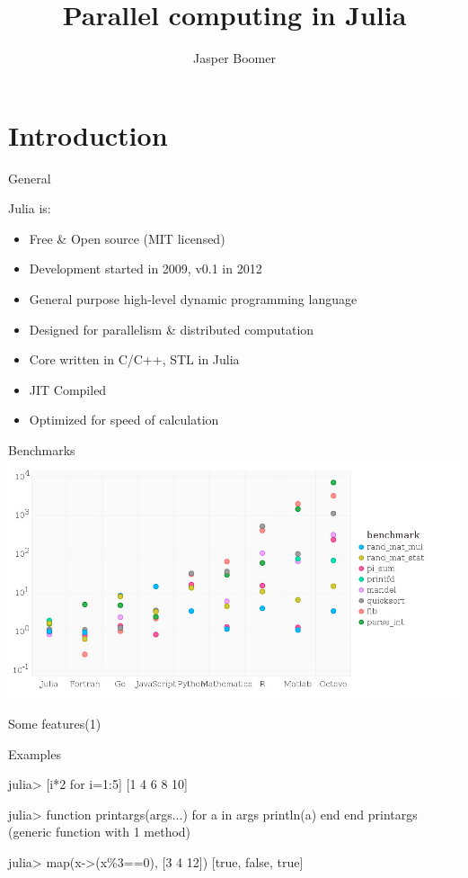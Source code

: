 \documentclass{beamer}
\title{Parallel computing in Julia}
\author{Jasper Boomer}
\begin{document}
	\frame{\titlepage}
	\section{Introduction}

	\begin{frame}{General}
		\begin{block}{Julia is:} 
		\begin{itemize}
			\item{Free \& Open source (MIT licensed)}
			\item{Development started in 2009, v0.1 in 2012}
			\item{General purpose high-level dynamic programming language}
			\item{Designed for parallelism \& distributed computation}
			\item{Core written in C/C++, STL in Julia}
			\item{JIT Compiled}
			\item{Optimized for speed of calculation}
		\end{itemize}
		\end{block}
	\end{frame}
	
	\begin{frame}{Benchmarks}
		\includegraphics[width=\textwidth]{figures/benchmarks.jpg}
	\end{frame}

	\begin{frame}[fragile]{Some features(1)}
		\begin{block}{Examples}
			\begin{semiverbatim}
			julia> [i*2 for i=1:5]
			[1 4 6 8 10]
			
			julia> function printargs(args...)
			         for a in args
		 	           println(a)
			         end
			       end
			printargs (generic function with 1 method)

			julia> map(x->(x\%3==0), [3 4 12])
			[true, false, true]
			\end{semiverbatim}
		\end{block}
	\end{frame}
\end{document}

